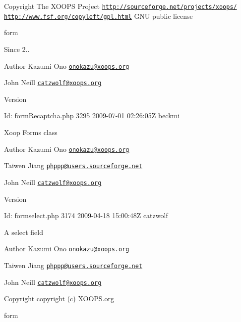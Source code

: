 \begin{DoxyCopyright}{Copyright}
The X\-O\-O\-P\-S Project \href{http://sourceforge.net/projects/xoops/}{\tt http\-://sourceforge.\-net/projects/xoops/}  \href{http://www.fsf.org/copyleft/gpl.html}{\tt http\-://www.\-fsf.\-org/copyleft/gpl.\-html} G\-N\-U public license
\end{DoxyCopyright}
form \begin{DoxySince}{Since}
2.. 
\end{DoxySince}
\begin{DoxyAuthor}{Author}
Kazumi Ono \href{mailto:onokazu@xoops.org}{\tt onokazu@xoops.\-org} 

John Neill \href{mailto:catzwolf@xoops.org}{\tt catzwolf@xoops.\-org} 
\end{DoxyAuthor}
\begin{DoxyVersion}{Version}

\end{DoxyVersion}
\begin{DoxyParagraph}{Id\-:}
form\-Recaptcha.\-php 3295 2009-\/07-\/01 02\-:26\-:05\-Z beckmi 
\end{DoxyParagraph}


Xoop Forms class \begin{DoxyAuthor}{Author}
Kazumi Ono \href{mailto:onokazu@xoops.org}{\tt onokazu@xoops.\-org} 

Taiwen Jiang \href{mailto:phppp@users.sourceforge.net}{\tt phppp@users.\-sourceforge.\-net} 

John Neill \href{mailto:catzwolf@xoops.org}{\tt catzwolf@xoops.\-org} 
\end{DoxyAuthor}
\begin{DoxyVersion}{Version}

\end{DoxyVersion}
\begin{DoxyParagraph}{Id\-:}
formselect.\-php 3174 2009-\/04-\/18 15\-:00\-:48\-Z catzwolf 
\end{DoxyParagraph}


A select field

\begin{DoxyAuthor}{Author}
Kazumi Ono \href{mailto:onokazu@xoops.org}{\tt onokazu@xoops.\-org} 

Taiwen Jiang \href{mailto:phppp@users.sourceforge.net}{\tt phppp@users.\-sourceforge.\-net} 

John Neill \href{mailto:catzwolf@xoops.org}{\tt catzwolf@xoops.\-org} 
\end{DoxyAuthor}
\begin{DoxyCopyright}{Copyright}
copyright (c) X\-O\-O\-P\-S.\-org
\end{DoxyCopyright}
form

